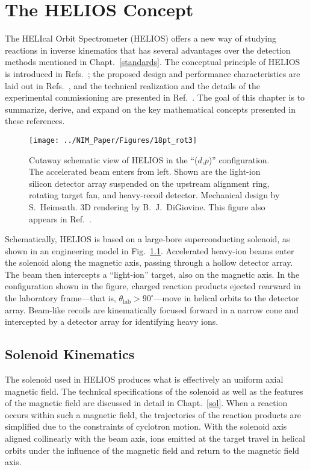\chapter{The HELIOS Concept}
\label{HELIOS_Concept}
The HELIcal Orbit Spectrometer (HELIOS) offers a new way of studying reactions in inverse kinematics that has several advantages over the detection methods mentioned in Chapt.~\ref{standards}.  The conceptual principle of HELIOS is introduced in Refs.~\cite{Schiffer_1998,Schiffer_2003}; the proposed design and performance characteristics are laid out in Refs.~\cite{Wuosmaa_2003,Wuosmaa_2007}, and the technical realization and the details of the experimental commissioning are presented in Ref.~\cite{Lighthall_2010}.  The goal of this chapter is to summarize, derive, and expand on the key mathematical concepts presented in these references.
\begin{figure}[!ht]
\centering
\texttt{[image: ../NIM\_Paper/Figures/18pt\_rot3]}
\caption[Cutaway schematic view of HELIOS in the ``($d$,$p$)'' configuration]{Cutaway schematic view of HELIOS in the ``($d$,$p$)'' configuration.  The accelerated beam enters from left.  Shown are the light-ion silicon detector array suspended on the upstream alignment ring, rotating target fan, and heavy-recoil detector.  Mechanical design by S.~Heimsath.  3D rendering by B.~J.\ DiGiovine.  This figure also appears in Ref.~\cite{Lighthall_2010}.}
\label{schematic}
\end{figure}

Schematically, HELIOS is based on a large-bore superconducting solenoid, as shown in an engineering model in Fig.~\ref{schematic}.  Accelerated heavy-ion beams enter the solenoid along the magnetic axis, passing through a hollow detector array.  The beam then intercepts a ``light-ion'' target, also on the magnetic axis.  In the configuration shown in the figure, charged reaction products ejected rearward in the laboratory frame---that is, $\theta_\mathrm{lab}>90^\circ$---move in helical orbits to the detector array.  Beam-like recoils are kinematically focused forward in a narrow cone and intercepted by a detector array for identifying heavy ions.
\section{Solenoid Kinematics}
\label{solkin}
The solenoid used in HELIOS produces what is effectively an uniform axial magnetic field.  The technical specifications of the solenoid as well as the features of the magnetic field are discussed in detail in Chapt.~\ref{sol}.  When a reaction occurs within such a magnetic field, the trajectories of the reaction products are simplified due to the constraints of cyclotron motion.  With the solenoid axis aligned collinearly with the beam axis, ions emitted at the target travel in helical orbits under the influence of the magnetic field and return to the magnetic field axis.
